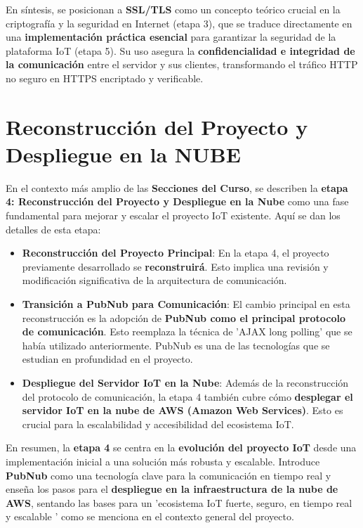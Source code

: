 \documentclass{report}
\begin{document}
En síntesis, se  posicionan a \textbf{SSL/TLS} como un concepto teórico crucial en la criptografía y la seguridad en Internet (etapa 3), 
que se traduce directamente en una \textbf{implementación práctica esencial} para garantizar la seguridad de la plataforma IoT (etapa 5). Su uso 
asegura la \textbf{confidencialidad e integridad de la comunicación} entre el servidor y sus clientes, transformando el tráfico HTTP no seguro en 
HTTPS encriptado y verificable.

\section{Reconstrucción del Proyecto y Despliegue en la NUBE}
En el contexto más amplio de las \textbf{Secciones del Curso}, se  describen la \textbf{etapa 4: Reconstrucción del Proyecto y Despliegue 
en la Nube} como una fase fundamental para mejorar y escalar el proyecto IoT existente. Aquí se dan los detalles de esta etapa:

\begin{itemize}
    \item \textbf{Reconstrucción del Proyecto Principal}: En la etapa 4, el proyecto previamente desarrollado se \textbf{reconstruirá}. Esto implica 
    una revisión y modificación significativa de la arquitectura de comunicación.
    \item \textbf{Transición a PubNub para Comunicación}: El cambio principal en esta reconstrucción es la adopción de \textbf{PubNub como el 
    principal protocolo de comunicación}. Esto reemplaza la técnica de  'AJAX long polling' que se había utilizado anteriormente. PubNub es una 
    de las tecnologías que se estudian en profundidad en el proyecto.
    \item \textbf{Despliegue del Servidor IoT en la Nube}: Además de la reconstrucción del protocolo de comunicación, la etapa 4 también cubre 
    cómo \textbf{desplegar el servidor IoT en la nube de AWS (Amazon Web Services)}. Esto es crucial para la escalabilidad y accesibilidad del ecosistema IoT.
\end{itemize}
En resumen, la \textbf{etapa 4} se centra en la \textbf{evolución del proyecto IoT} desde una implementación inicial a una solución más robusta y 
escalable. Introduce \textbf{PubNub} como una tecnología clave para la comunicación en tiempo real y enseña los pasos para el \textbf{despliegue en 
la infraestructura de la nube de AWS}, sentando las bases para un  'ecosistema IoT fuerte, seguro, en tiempo real y escalable ' como se menciona en el 
contexto general del proyecto.
\end{document}
